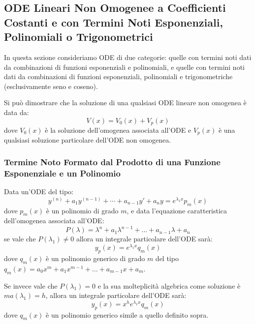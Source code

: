\documentclass[a4paper,11pt]{article}
\begin{document}
\subsection[ODE Lineari Non Omogenee Particolari]{ODE Lineari Non Omogenee a Coefficienti Costanti e con Termini Noti Esponenziali, Polinomiali o Trigonometrici}
In questa sezione consideriamo ODE di due categorie: quelle con termini noti dati da combinazioni di funzioni esponenziali e polinomiali, e quelle con termini noti dati da combinazioni di funzioni esponenziali, polinomiali e trigonometriche (esclusivamente seno e coseno).

Si può dimostrare che la soluzione di una qualsiasi ODE lineare non omogenea è data da:
\begin{equation}\label{eq:odegen}
    V(x)=V_0(x)+V_p(x)
\end{equation}
dove $V_0(x)$ è la soluzione dell'omogenea associata all'ODE e $V_p(x)$ è una qualsiasi soluzione particolare dell'ODE non omogenea.

\subsubsection[\texorpdfstring{$f(x)$ da Esponenziale e Polinomio}{f(x) da Esponenziale e Polinomio}]{Termine Noto Formato dal Prodotto di una Funzione Esponenziale e un Polinomio}
Data un'ODE del tipo:
\begin{equation*}
       y^{(n)} + a_1y^{(n-1)} + \cdots + a_{n-1}y' + a_ny = e^{\lambda_1 x}p_m(x)
\end{equation*}
dove $p_m(x)$ è un polinomio di grado $m$, e data l'equazione caratteristica dell'omogenea associata all'ODE:
\begin{equation*}
    P(\lambda) = \lambda^n + a_1\lambda^{n-1} + \ldots + a_{n-1}\lambda + a_n
\end{equation*}
se vale che $P(\lambda_1) \neq 0$ allora un integrale particolare dell'ODE sarà:
\begin{equation*}
    y_p(x) = e^{\lambda_1 x}q_m(x)
\end{equation*}
dove $q_m(x)$ è un polinomio generico di grado $m$ del tipo $q_m(x) = a_0x^m + a_1x^{m-1} + \ldots + a_{m-1}x+a_m$.

Se invece vale che $P(\lambda_1) = 0$ e la sua molteplicità algebrica come soluzione è $ma(\lambda_1) = h$, allora un integrale particolare dell'ODE sarà:
\begin{equation*}
    y_p(x) = x^he^{\lambda_1 x}q_m(x)
\end{equation*}
dove $q_m(x)$ è un polinomio generico simile a quello definito sopra.
\end{document}
